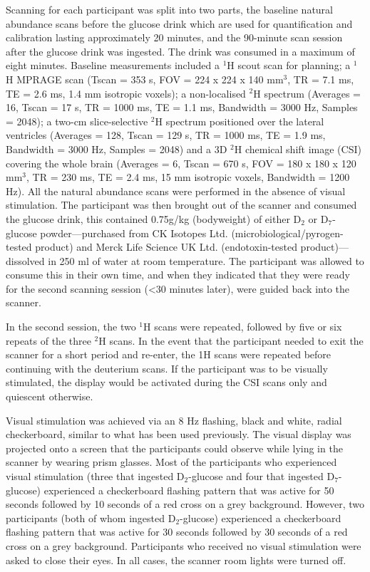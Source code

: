 \documentclass[class=article, crop=false]{standalone}
\begin{document}
Scanning for each participant was split into two parts, the baseline natural abundance scans before the glucose drink which are used for quantification and calibration lasting approximately 20 minutes, and the 90-minute scan session after the glucose drink was ingested. The drink was consumed in a maximum of eight minutes. Baseline measurements included a $^1$H scout scan for planning; a $^1$H MPRAGE scan (Tscan = 353 s, FOV = 224 x 224 x 140 mm$^3$, TR = 7.1 ms, TE = 2.6 ms, 1.4 mm isotropic voxels); a non-localised $^2$H spectrum (Averages = 16, Tscan = 17 s, TR = 1000 ms, TE = 1.1 ms, Bandwidth = 3000 Hz, Samples = 2048); a two-cm slice-selective $^2$H spectrum positioned over the lateral ventricles (Averages = 128, Tscan = 129 s, TR = 1000 ms, TE = 1.9 ms, Bandwidth = 3000 Hz, Samples = 2048) and a 3D $^2$H chemical shift image (CSI) covering the whole brain (Averages = 6, Tscan = 670 s, FOV = 180 x 180 x 120 mm$^3$, TR = 230 ms, TE = 2.4 ms, 15 mm isotropic voxels, Bandwidth = 1200 Hz). All the natural abundance scans were performed in the absence of visual stimulation. The participant was then brought out of the scanner and consumed the glucose drink, this contained 0.75g/kg (bodyweight) of either D$_2$ or D$_7$-glucose powder—purchased from CK Isotopes Ltd. (microbiological/pyrogen-tested product) and Merck Life Science UK Ltd. (endotoxin-tested product)—dissolved in 250 ml of water at room temperature. The participant was allowed to consume this in their own time, and when they indicated that they were ready for the second scanning session (<30 minutes later), were guided back into the scanner.


In the second session, the two $^1$H scans were repeated, followed by five or six repeats of the three $^2$H scans. In the event that the participant needed to exit the scanner for a short period and re-enter, the 1H scans were repeated before continuing with the deuterium scans. If the participant was to be visually stimulated, the display would be activated during the CSI scans only and quiescent otherwise.  

Visual stimulation was achieved via an 8 Hz flashing, black and white, radial checkerboard, similar to what has been used previously\cite{Fernandes2020MeasurementT}. The visual display was projected onto a screen that the participants could observe while lying in the scanner by wearing prism glasses. Most of the participants who experienced visual stimulation (three that ingested D$_2$-glucose and four that ingested D$_7$-glucose) experienced a checkerboard flashing pattern that was active for 50 seconds followed by 10 seconds of a red cross on a grey background. However, two participants (both of whom ingested D$_2$-glucose) experienced a checkerboard flashing pattern that was active for 30 seconds followed by 30 seconds of a red cross on a grey background. Participants who received no visual stimulation were asked to close their eyes. In all cases, the scanner room lights were turned off. 
\end{document}
